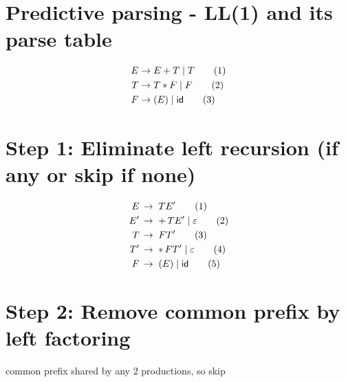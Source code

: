\section*{Predictive parsing - LL(1) and its parse table}
\begin{align*}
  E \to\;& E + T \;|\; T         \tag{1} \\
  T \to\;& T * F \;|\; F         \tag{2} \\
  F \to\;& (E) \;|\; \mathsf{id} \tag{3}
\end{align*}
\section*{Step 1: Eliminate left recursion (if any or skip if none)}
\begin{align*}
  E\,  & \to\; TE'                     \tag{1} \\
  E'\, & \to\; +\,TE' \;|\; \varepsilon \tag{2} \\
  T\,  & \to\; FT'                     \tag{3} \\
  T'\, & \to\; *\,FT' \;|\; \varepsilon \tag{4} \\
  F\,  & \to\; (E)    \;|\; \mathsf{id} \tag{5}
\end{align*}
\section*{Step 2: Remove common prefix by left factoring}
 common prefix shared by any 2 productions, so skip

